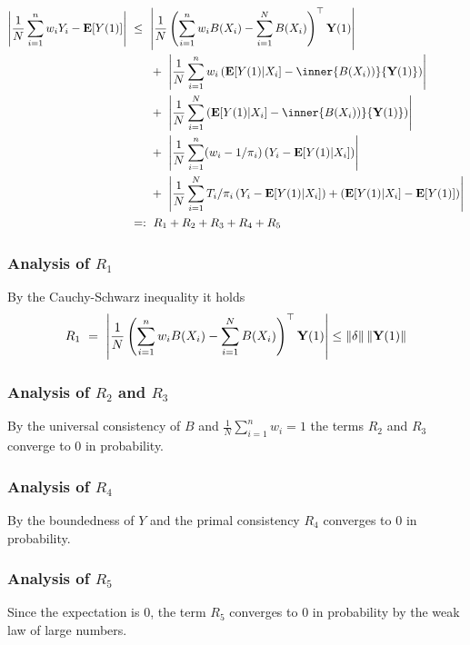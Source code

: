 \begin{align*}
  \left| 
    \frac{1}{N}
    \sum_{i=1}^{n} 
    w_i
    Y_i
    -
    \E[Y(1)]
  \right|
  &
  \ 
  \le
  \ 
  \left|  
  \frac{1}{N}
  \left( 
    \sum_{i=1}^{n} 
    w_i
    B(X_i)
    -
    \sum_{i=1}^{N} 
    B(X_i)
  \right)
  ^\top
     \mathbf{Y}(1) 
  \right|
  \\
  &
  \qquad
  +
  \ 
  \left|  
  \frac{1}{N}
    \sum_{i=1}^{n} 
    w_i
    \left( 
    \E[Y(1)| X_i]
    -
    \inner
    {B(X_i))}
    { \mathbf{Y}(1) }
    \right)
  \right|
  \\
  &
  \qquad
  +
  \ 
  \left|  
  \frac{1}{N}
    \sum_{i=1}^{N} 
    \left( 
    \E[Y(1)| X_i]
    -
    \inner
    {B(X_i))}
    { \mathbf{Y}(1) }
    \right)
  \right|
  \\
  &
  \qquad
  +
  \ 
  \left|  
  \frac{1}{N}
    \sum_{i=1}^{n} 
    (
    w_i 
    -
    1/\pi_i
    )
    \left( 
      Y_i
    -
    \E[Y(1)| X_i]
    \right)
  \right|
  \\
  &
  \qquad
  +
  \ 
  \left|  
  \frac{1}{N}
    \sum_{i=1}^{N} 
    T_i
    /\pi_i
    \left( 
      Y_i
    -
    \E[Y(1)| X_i]
    \right)
    +
    \left( 
    \E[Y(1)| X_i]
    -
    \E[Y(1)]
    \right)
  \right|
  \\
  &
  \ 
  =:
  \ 
  R_1
  +
  R_2
  +
  R_3
  +
  R_4
  +
  R_5
  \end{align*}
  \subsubsection*{Analysis of $R_1$}
  By the Cauchy-Schwarz inequality it holds
  \begin{gather}
    R_1
    \ 
    =
    \ 
   \left|  
  \frac{1}{N}
  \left( 
    \sum_{i=1}^{n} 
    w_i
    B(X_i)
    -
    \sum_{i=1}^{N} 
    B(X_i)
  \right)
  ^\top
     \mathbf{Y}(1) 
  \right|
  \le
  \norm{\delta}
  \norm{
     \mathbf{Y}(1) 
  }
  \end{gather}

  \subsubsection*{Analysis of $R_2$ and $R_3$}
By the universal consistency of $B$ and 
$
  \frac{1}{N}
    \sum_{i=1}^{n} 
    w_i
    =1
$
the terms
$R_2$ and $R_3$ converge to $0$ in probability.
\subsubsection*{Analysis of $R_4$}
By the boundedness of $Y$ and the primal consistency 
$R_4$ 
converges to $0$ in probability.
\subsubsection*{Analysis of $R_5$}
Since the expectation is $0$, the term $R_5$ 
converges to $0$ in probability by the weak law of large numbers.

